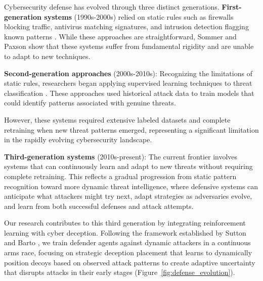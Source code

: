 \documentclass[12pt,oneside]{article}
\begin{document}
Cybersecurity defense has evolved through three distinct generations. \textbf{First-generation systems} (1990s-2000s) relied on static rules such as firewalls blocking traffic, antivirus matching signatures, and intrusion detection flagging known patterns \cite{alpcan2010network}. While these approaches are straightforward, Sommer and Paxson \cite{sommer2010outside} show that these systems suffer from fundamental rigidity and are unable to adapt to new techniques.

\textbf{Second-generation approaches} (2000s-2010s): Recognizing the limitations of static rules, researchers began applying supervised learning techniques to threat classification \cite{sommer2010outside}. These approaches used historical attack data to train models that could identify patterns associated with genuine threats. 

However, these systems required extensive labeled datasets and complete retraining when new threat patterns emerged, representing a significant limitation in the rapidly evolving cybersecurity landscape.

\textbf{Third-generation systems} (2010s-present): The current frontier involves systems that can continuously learn and adapt to new threats without requiring complete retraining. This reflects a gradual progression from static pattern recognition toward more dynamic threat intelligence, where defensive systems can anticipate what attackers might try next, adapt strategies as adversaries evolve, and learn from both successful defenses and attack attempts.

Our research contributes to this third generation by integrating reinforcement learning with cyber deception. Following the framework established by Sutton and Barto \cite{sutton2018reinforcement}, we train defender agents against dynamic attackers in a continuous arms race, focusing on strategic deception placement that learns to dynamically position decoys based on observed attack patterns to create adaptive uncertainty that disrupts attacks in their early stages (Figure~\ref{fig:defense_evolution}).
\end{document}
